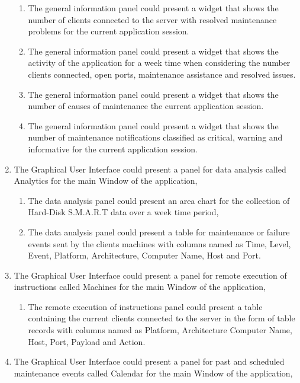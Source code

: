 \begin{enumerate}
\begin{enumerate}
        \item The general information panel could present a widget that shows the number of clients connected
        to the server with resolved maintenance problems for the current application session.
        \item The general information panel could present a widget that shows the activity of the application
        for a week time when considering the number clients connected, open ports, maintenance assistance
        and resolved issues.
        \item The general information panel could present a widget that shows the number of causes of maintenance
        the current application session.
        \item The general information panel could present a widget that shows the number of maintenance
        notifications classified as critical, warning and informative for the current application session.
    \end{enumerate}
    \newpage
    \item The Graphical User Interface could present a panel for data analysis called Analytics for the main
    Window of the application,
    \begin{enumerate}
        \item The data analysis panel could present an area chart for the collection of Hard-Disk S.M.A.R.T data
        over a week time period,
        \item The data analysis panel could present a table for maintenance or failure events sent by the clients
        machines with columns named as Time, Level, Event, Platform, Architecture, Computer Name, Host and
        Port.
    \end{enumerate}
    \item The Graphical User Interface could present a panel for remote execution of instructions called Machines
    for the main Window of the application,
    \begin{enumerate}
        \item The remote execution of instructions panel could present a table containing the current clients
        connected to the server in the form of table records with columns named as Platform, Architecture
        Computer Name, Host, Port, Payload and Action.
    \end{enumerate}
    \item The Graphical User Interface could present a panel for past and scheduled maintenance events
    called Calendar for the main Window of the application,

\end{enumerate}
